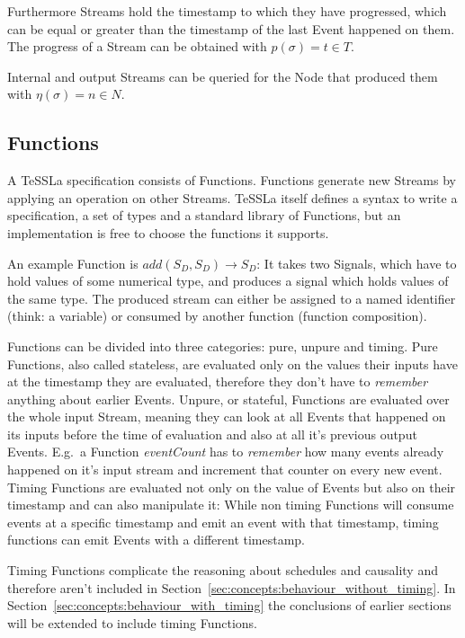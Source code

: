 Furthermore Streams hold the timestamp to which they have progressed, which can be equal or greater than the timestamp of the last Event happened on them.
The progress of a Stream can be obtained with \(p(\sigma) = t \in T\).

Internal and output Streams can be queried for the Node that produced them with \(\eta(\sigma) = n \in N\).

\subsection{Functions}
\label{sec:concepts:defs:functions}

A TeSSLa specification consists of Functions.
Functions generate new Streams by applying an operation on other Streams.
TeSSLa itself defines a syntax to write a specification, a set of types and a standard library of Functions, but an implementation is free to choose the functions it supports.

An example Function is \(add(S_D,S_D) \rightarrow S_D\): It takes two Signals, which have to hold values of some numerical type, and produces a signal which holds values of the same type.
The produced stream can either be assigned to a named identifier (think: a variable) or consumed by another function (function composition).

Functions can be divided into three categories: pure, unpure and timing.
Pure Functions, also called stateless, are evaluated only on the values their inputs have at the timestamp they are evaluated, therefore they don't have to \emph{remember} anything about earlier Events.
Unpure, or stateful, Functions are evaluated over the whole input Stream, meaning they can look at all Events that happened on its inputs before the time of evaluation and also at all it's previous output Events.
E.g.\ a Function \emph{eventCount} has to \emph{remember} how many events already happened on it's input stream and increment that counter on every new event.
Timing Functions are evaluated not only on the value of Events but also on their timestamp and can also manipulate it:
While non timing Functions will consume events at a specific timestamp and emit an event with that timestamp, timing functions can emit Events with a different timestamp.

Timing Functions complicate the reasoning about schedules and causality and therefore aren't included in Section~\ref{sec:concepts:behaviour_without_timing}.
In Section~\ref{sec:concepts:behaviour_with_timing} the conclusions of earlier sections will be extended to include timing Functions.


